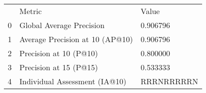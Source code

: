 \begin{tabular}{lll}
 & Metric & Value \\
0 & Global Average Precision & 0.906796 \\
1 & Average Precision at 10 (AP@10) & 0.906796 \\
2 & Precision at 10 (P@10) & 0.800000 \\
3 & Precision at 15 (P@15) & 0.533333 \\
4 & Individual Assessment (IA@10) & RRRNRRRRRN \\
\end{tabular}
